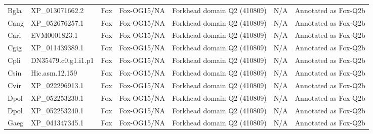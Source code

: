 \documentclass[../main.tex]{subfiles}
\begin{document}
\begin{landscape}
\begin{longtable}{lllllll}
		Bgla           & XP\_013071662.2       & Fox            & Fox-OG15/NA         & Forkhead domain Q2 (410809)                 & N/A                                                                    & Annotated as Fox-Q2b \\
		Cang           & XP\_052676257.1       & Fox            & Fox-OG15/NA         & Forkhead domain Q2 (410809)                 & N/A                                                                    & Annotated as Fox-Q2b \\
		Cari           & EVM0001823.1          & Fox            & Fox-OG15/NA         & Forkhead domain Q2 (410809)                 & N/A                                                                    & Annotated as Fox-Q2b \\
		Cgig           & XP\_011439389.1       & Fox            & Fox-OG15/NA         & Forkhead domain Q2 (410809)                 & N/A                                                                    & Annotated as Fox-Q2b \\
		Cpli           & DN35479.c0.g1.i1.p1   & Fox            & Fox-OG15/NA         & Forkhead domain Q2 (410809)                 & N/A                                                                    & Annotated as Fox-Q2b \\
		Csin           & Hic.asm.12.159        & Fox            & Fox-OG15/NA         & Forkhead domain Q2 (410809)                 & N/A                                                                    & Annotated as Fox-Q2b \\
		Cvir           & XP\_022296913.1       & Fox            & Fox-OG15/NA         & Forkhead domain Q2 (410809)                 & N/A                                                                    & Annotated as Fox-Q2b \\
		Dpol           & XP\_052253230.1       & Fox            & Fox-OG15/NA         & Forkhead domain Q2 (410809)                 & N/A                                                                    & Annotated as Fox-Q2b \\
		Dpol           & XP\_052253240.1       & Fox            & Fox-OG15/NA         & Forkhead domain Q2 (410809)                 & N/A                                                                    & Annotated as Fox-Q2b \\
		Gaeg           & XP\_041347345.1       & Fox            & Fox-OG15/NA         & Forkhead domain Q2 (410809)                 & N/A                                                                    & Annotated as Fox-Q2b \\

\end{longtable}
\end{landscape}
\end{document}
